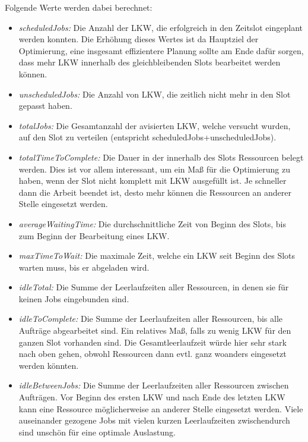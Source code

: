 Folgende Werte werden dabei berechnet:


\begin{itemize}
    \item \textit{scheduledJobs:} Die Anzahl der LKW, die erfolgreich in den Zeitslot eingeplant werden konnten. Die Erhöhung dieses Wertes ist da Hauptziel der Optimierung, eine insgesamt effizientere Planung sollte am Ende dafür sorgen, dass mehr LKW innerhalb des gleichbleibenden Slots bearbeitet werden können.
    \item \textit{unscheduledJobs:} Die Anzahl von LKW, die zeitlich nicht mehr in den Slot gepasst haben.
    \item \textit{totalJobs:} Die Gesamtanzahl der avisierten LKW, welche versucht wurden, auf den Slot zu verteilen (entspricht scheduledJobs+unscheduledJobs).
    \item \textit{totalTimeToComplete:} Die Dauer in der innerhalb des Slots Ressourcen belegt werden. Dies ist vor allem interessant, um ein Maß für die Optimierung zu haben, wenn der Slot nicht komplett mit LKW ausgefüllt ist. Je schneller dann die Arbeit beendet ist, desto mehr können die Ressourcen an anderer Stelle eingesetzt werden.
    \item \textit{averageWaitingTime:} Die durchschnittliche Zeit von Beginn des Slots, bis zum Beginn der Bearbeitung eines LKW. 
    \item \textit{maxTimeToWait:} Die maximale Zeit, welche ein LKW seit Beginn des Slots warten muss, bis er abgeladen wird.
    \item \textit{idleTotal:} Die Summe der Leerlaufzeiten aller Ressourcen, in denen sie für keinen Jobs eingebunden sind.
    \item \textit{idleToComplete:} Die Summe der Leerlaufzeiten aller Ressourcen, bis alle Aufträge abgearbeitet sind. Ein relatives Maß, falls zu wenig LKW für den ganzen Slot vorhanden sind. Die Gesamtleerlaufzeit würde hier sehr stark nach oben gehen, obwohl Ressourcen dann evtl. ganz woanders eingesetzt werden könnten.
    \item \textit{idleBetweenJobs:} Die Summe der Leerlaufzeiten aller Ressourcen zwischen Aufträgen. Vor Beginn des ersten LKW und nach Ende des letzten LKW kann eine Ressource möglicherweise an anderer Stelle eingesetzt werden. Viele auseinander gezogene Jobs mit vielen kurzen Leerlaufzeiten zwischendurch sind unschön für eine optimale Auslastung.
\end{itemize}


